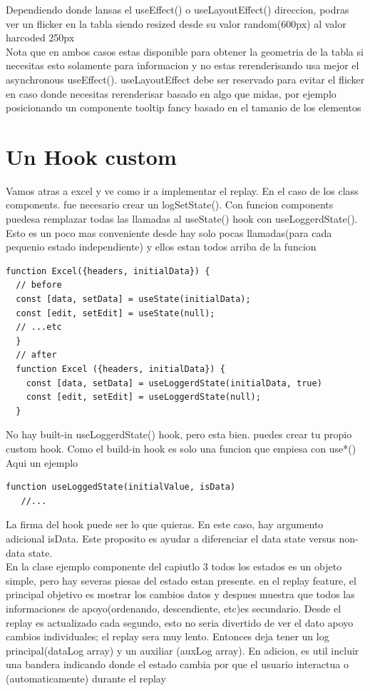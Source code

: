Dependiendo donde lansas el useEffect() o useLayoutEffect() direccion, podras ver un flicker en la tabla siendo resized desde su valor random(600px) al valor harcoded 250px
\\
Nota que en ambos casos estas disponible para obtener la geometria de la tabla si necesitas esto solamente para informacion y no estas rerenderisando usa mejor el asynchronous useEffect(). useLayoutEffect debe ser reservado para evitar el flicker en caso donde necesitas rerenderisar basado en algo que midas, por ejemplo posicionando un componente tooltip fancy basado en el tamanio de los elementos 
\section{Un Hook custom}
Vamos atras a excel y ve como ir a implementar el replay. En el caso de los class components. fue necesario crear un logSetState(). Con funcion components puedesa remplazar todas las llamadas al useState() hook con useLoggerdState(). Esto es un poco mas conveniente desde hay solo pocas llamadas(para cada pequenio estado independiente) y ellos estan todos arriba de la funcion
\begin{lstlisting}[language=html]
function Excel({headers, initialData}) {
  // before
  const [data, setData] = useState(initialData);
  const [edit, setEdit] = useState(null);
  // ...etc
  }
  // after
  function Excel ({headers, initialData}) {
    const [data, setData] = useLoggerdState(initialData, true)
    const [edit, setEdit] = useLoggerdState(null);
  }
\end{lstlisting}
No hay built-in useLoggerdState() hook, pero esta bien. puedes crear tu propio custom hook. Como el build-in hook es solo una funcion que empiesa con use*() Aqui un ejemplo
\begin{lstlisting}[language=html]
function useLoggedState(initialValue, isData)
   //...
\end{lstlisting}
La firma del hook puede ser lo que quieras. En este caso, hay argumento adicional isData. Este proposito es ayudar a diferenciar el data state versus non-data state.\\
En la clase ejemplo componente del capiutlo 3 todos los estados es un objeto simple, pero hay severas piesas del estado estan presente. en el replay feature, el principal objetivo es mostrar los cambios datos y despues muestra que todos las informaciones de apoyo(ordenando, descendiente, etc)es secundario. Desde el replay es actualizado cada segundo, esto no seria divertido de ver el dato apoyo cambios individuales; el replay sera muy lento. Entonces deja tener un log principal(dataLog array) y un auxiliar (auxLog array). En adicion, es util incluir una bandera indicando donde el estado cambia por que el usuario interactua o (automaticamente) durante el replay
